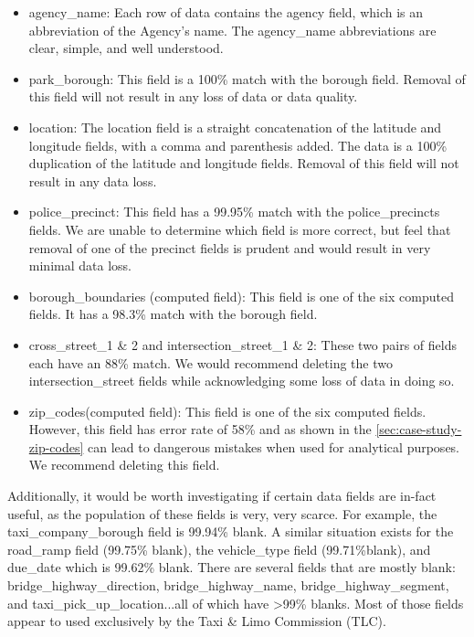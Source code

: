\documentclass[12pt, titlepage]{article}
\begin{document}
 
\begin{itemize}
	\item agency\_name: Each row of data contains the agency field, 
	which is an abbreviation of the Agency's name. The agency\_name 
	abbreviations are clear, simple, and well understood.
		    
	\item park\_borough:  This field is a 100\% match with the 
	borough field. Removal of this field will not result in any loss of 
	data or data quality.
		    
	\item location:  The location field is a straight concatenation of 
	the latitude and longitude fields, with a comma and parenthesis 
	added. The data is a 100\% duplication of the latitude 
	and longitude fields. Removal of this field will not 
	result in any data loss.
		    
	\item police\_precinct: This field has a 99.95\% match with the 
	police\_precincts fields. We are unable to determine which field 
	is more correct, but feel that removal of one of the precinct fields 
	is prudent and would result in very minimal data loss.
		   
	\item borough\_boundaries (computed field): This field is one of 
	the six computed fields. It has a 98.3\% match with the borough 
	field.
		    
	\item cross\_street\_1 \& 2 and intersection\_street\_1 \& 2: These 
	two pairs of fields each have an 88\% match. We would recommend 
	deleting the two intersection\_street fields while acknowledging 
	some loss of data in doing so.
		     
	\item zip\_codes(computed field):  This field is one of the six 
	computed fields.  However, this field has error rate of 58\% and 
	as shown in the \ref{sec:case-study-zip-codes} can lead to 
	dangerous mistakes when used for analytical purposes. 
	We recommend deleting this field.
\end{itemize}
 	
 	
Additionally, it would be worth investigating if certain data fields are 
in-fact useful, as the population of these fields is very, very scarce. For 
example, the taxi\_company\_borough field is 99.94\% 
blank. A similar situation exists for the road\_ramp field 
(99.75\% blank), the vehicle\_type field (99.71\%blank), and 
due\_date which is 99.62\% blank. There are several fields that are 
mostly blank: bridge\_highway\_direction, bridge\_highway\_name, 
bridge\_highway\_segment, and taxi\_pick\_up\_location...all 
of which have \textgreater99\% blanks. Most of those fields 
appear to used exclusively by the Taxi \& Limo Commission (TLC).   
\end{document}
